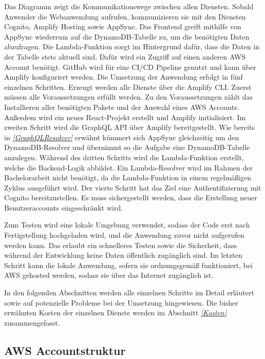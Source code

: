Das Diagramm zeigt die Kommunikationswege zwischen allen Diensten.
Sobald Anwender die Webanwendung aufrufen, kommunizieren sie mit den Diensten Cognito, Amplify Hosting sowie AppSync.
Das Frontend greift mithilfe von AppSync wiederrum auf die DynamoDB-Tabelle zu, um die benötigten Daten abzufragen.
Die Lambda-Funktion sorgt im Hintergrund dafür, dass die Daten in der Tabelle stets aktuell sind.
Dafür wird ein Zugriff auf einen anderen AWS Account benötigt.
GitHub wird für eine CI/CD Pipeline genutzt und kann über Amplify konfiguriert werden.
\clearpage
Die Umsetzung der Anwendung erfolgt in fünf einzelnen Schritten.
Erzeugt werden alle Dienste über die Amplify CLI.
Zuerst müssen alle Voraussetzungen erfüllt werden.
Zu den Voraussetzungen zählt das Installieren aller benötigten Pakete und der Auswahl eines AWS Accounts.
Außerdem wird ein neues React-Projekt erstellt und Amplify initialisiert.
Im zweiten Schritt wird die GraphQL API über Amplify bereitgestellt.
Wie bereits in \textit{\ref{GraphQLResolver} } erwähnt kümmert sich AppSync gleichzeitig um den DynamoDB-Resolver und übernimmt so die Aufgabe eine DynamoDB-Tabelle anzulegen.
Während des dritten Schritts wird die Lambda-Funktion erstellt, welche die Backend-Logik abbildet.
Ein Lambda-Resolver wird im Rahmen der Bachelorarbeit nicht benötigt, da die Lambda-Funktion in einem regelmäßigen Zyklus ausgeführt wird.
Der vierte Schritt hat das Ziel eine Authentifizierung mit Cognito bereitzustellen.
Es muss sichergestellt werden, dass die Erstellung neuer Benutzeraccounts eingeschränkt wird.

Zum Testen wird eine lokale Umgebung verwendet, sodass der Code erst nach Fertigstellung hochgeladen wird, und die Anwendung zuvor nicht aufgerufen werden kann.
Das erlaubt ein schnelleres Testen sowie die Sicherheit, dass während der Entwicklung keine Daten öffentlich zugänglich sind.
Im letzten Schritt kann die lokale Anwendung, sofern sie ordnungsgemäß funktioniert, bei AWS gehosted werden, sodass sie über das Internet zugänglich ist.


In den folgenden Abschnitten werden alle einzelnen Schritte im Detail erläutert sowie auf potenzielle Probleme bei der Umsetzung hingewiesen.
Die bisher erwähnten Kosten der einzelnen Dienste werden im Abschnitt \textit{\ref{Kosten} } zusammengefasst.

\subsection{AWS Accountstruktur }
\label{Accountstruktur}

